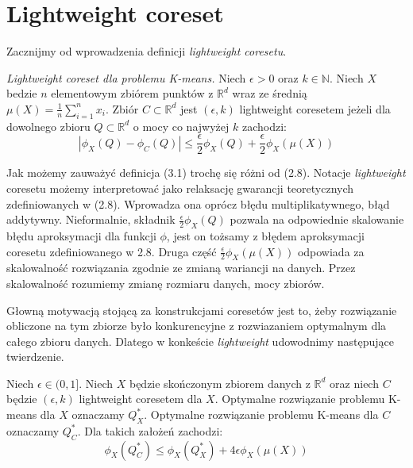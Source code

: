 \section{Lightweight coreset}

Zacznijmy od wprowadzenia definicji \textit{lightweight coresetu}.
\begin{definition}
    \emph{Lightweight coreset dla problemu K-means.} Niech $\epsilon > 0$ oraz $k \in \mathbb{N}$.
    Niech $X$ bedzie $n$ elementowym zbiórem punktów z $\mathbb{R}^{d}$ wraz ze średnią $\mu(X) = \frac{1}{n}\sum_{i=1}^{n} x_{i}$.
    Zbiór $C \subset \mathbb{R}^d$ jest $(\epsilon, k)$ lightweight coresetem jeżeli dla dowolnego zbioru $Q \subset \mathbb{R}^{d}$ o mocy co najwyżej $k$ zachodzi:
    \begin{equation}
        |\phi_{X}(Q) - \phi_{C}(Q)| \leq \frac{\epsilon}{2}\phi_{X}(Q) + \frac{\epsilon}{2}\phi_{X}(\mu(X))
    \end{equation}
\end{definition}

\noindent
Jak możemy zauważyć definicja (3.1) trochę się różni od (2.8).
Notacje \textit{lightweight} coresetu możemy interpretować jako relaksację gwarancji teoretycznych zdefiniowanych w (2.8).
Wprowadza ona oprócz błędu multiplikatywnego, błąd addytywny.
Nieformalnie, składnik $\frac{\epsilon}{2}\phi_{X}(Q)$ pozwala na odpowiednie skalowanie błędu aproksymacji dla funkcji $\phi$, jest on tożsamy z błędem aproksymacji coresetu zdefiniowanego w 2.8.
Druga część $\frac{\epsilon}{2}\phi_{X}(\mu(X))$ odpowiada za skalowalność rozwiązania zgodnie ze zmianą wariancji na danych.
Przez skalowalność rozumiemy zmianę rozmiaru danych, mocy zbiorów.

Głowną motywacją stojącą za konstrukcjami coresetów jest to, żeby rozwiązanie obliczone na tym zbiorze było konkurencyjne z rozwiazaniem optymalnym dla całego zbioru danych.
Dlatego w konkeście \textit{lightweight} udowodnimy następujące twierdzenie.

\begin{thm}{\cite{bachem2017scalable}}
    Niech $\epsilon \in (0, 1]$. Niech $X$ będzie skończonym zbiorem danych z $\mathbb{R}^d$ oraz niech $C$ będzie $(\epsilon, k)$ lightweight coresetem dla $X$.
    Optymalne rozwiązanie problemu K-means dla $X$ oznaczamy $Q_{X}^{*}$.
    Optymalne rozwiązanie problemu K-means dla $C$ oznaczamy $Q_{C}^{*}$.
    Dla takich założeń zachodzi:
    \begin{equation}
        \phi_{X}(Q_{C}^{*}) \leq \phi_{X}(Q_{X}^{*}) + 4\epsilon\phi_{X}(\mu(X))
    \end{equation}
\end{thm}

